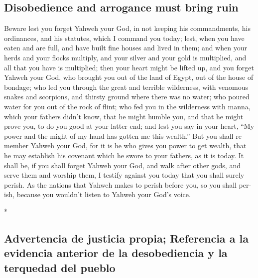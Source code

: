 \begin{paracol}{2}
\begin{otherlanguage}{english}
\hypertarget{disobedience-and-arrogance-must-bring-ruin}{%
\subsection{Disobedience and arrogance must bring
ruin}\label{disobedience-and-arrogance-must-bring-ruin}}

 Beware lest you forget Yahweh your God, in not keeping
his commandments, his ordinances, and his statutes, which I command you
today;  lest, when you have eaten and are full, and have
built fine houses and lived in them;  and when your herds
and your flocks multiply, and your silver and your gold is multiplied,
and all that you have is multiplied;  then your heart
might be lifted up, and you forget Yahweh your God, who brought you out
of the land of Egypt, out of the house of bondage;  who
led you through the great and terrible wilderness, with venomous snakes
and scorpions, and thirsty ground where there was no water; who poured
water for you out of the rock of flint;  who fed you in
the wilderness with manna, which your fathers didn't know, that he might
humble you, and that he might prove you, to do you good at your latter
end;  and lest you say in your heart, ``My power and the
might of my hand has gotten me this wealth.''  But you
shall remember Yahweh your God, for it is he who gives you power to get
wealth, that he may establish his covenant which he swore to your
fathers, as it is today.  It shall be, if you shall
forget Yahweh your God, and walk after other gods, and serve them and
worship them, I testify against you today that you shall surely perish.
 As the nations that Yahweh makes to perish before you,
so you shall perish, because you wouldn't listen to Yahweh your God's
voice.

\end{otherlanguage}

\switchcolumn[0]*

\hypertarget{advertencia-de-justicia-propia-referencia-a-la-evidencia-anterior-de-la-desobediencia-y-la-terquedad-del-pueblo}{%
\subsection{Advertencia de justicia propia; Referencia a la evidencia
anterior de la desobediencia y la terquedad del
pueblo}\label{advertencia-de-justicia-propia-referencia-a-la-evidencia-anterior-de-la-desobediencia-y-la-terquedad-del-pueblo}}


\end{paracol}
